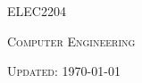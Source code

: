 \documentclass[a4paper,11pt]{article}
\begin{document}

\begin{center}
    {\scshape\huge ELEC2204\par} \vspace{0.5cm}
    {\scshape\Large Computer Engineering\par} \vspace{2cm}
    {\scshape Updated: \today}
\end{center}
\pagebreak

\tableofcontents \pagebreak




\end{document}
